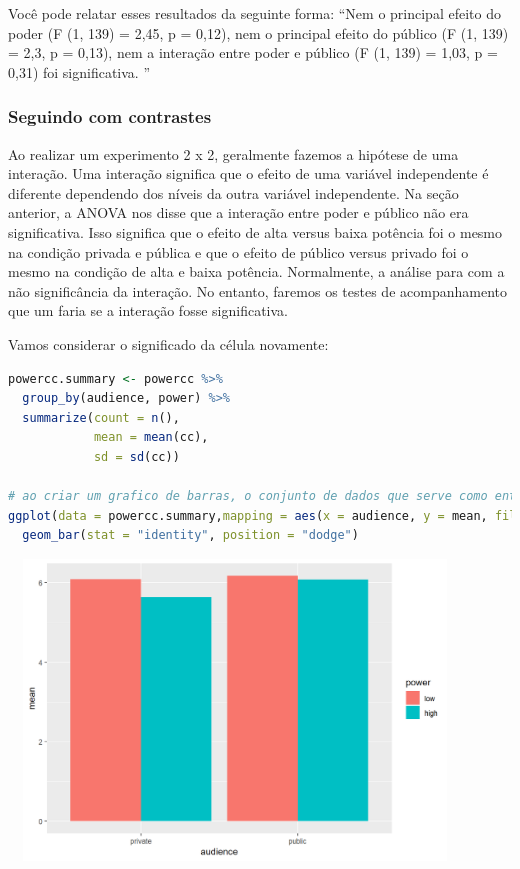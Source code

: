 \documentclass{article}
\begin{document}
Você pode relatar esses resultados da seguinte forma: “Nem o principal efeito do poder (F (1, 139) = 2,45, p = 0,12), nem o principal efeito do público (F (1, 139) = 2,3, p = 0,13), nem a interação entre poder e público (F (1, 139) = 1,03, p = 0,31) foi significativa. ”

\subsubsection{Seguindo com contrastes}

Ao realizar um experimento 2 x 2, geralmente fazemos a hipótese de uma interação. Uma interação significa que o efeito de uma variável independente é diferente dependendo dos níveis da outra variável independente. Na seção anterior, a ANOVA nos disse que a interação entre poder e público não era significativa. Isso significa que o efeito de alta versus baixa potência foi o mesmo na condição privada e pública e que o efeito de público versus privado foi o mesmo na condição de alta e baixa potência. Normalmente, a análise para com a não significância da interação. No entanto, faremos os testes de acompanhamento que um faria se a interação fosse significativa.

Vamos considerar o significado da célula novamente:

\begin{lstlisting}[language=R]
powercc.summary <- powercc %>% 
  group_by(audience, power) %>% 
  summarize(count = n(),
            mean = mean(cc),
            sd = sd(cc))

# ao criar um grafico de barras, o conjunto de dados que serve como entrada para o ggplot eh o resumo com os meios, nao o conjunto de dados completo
ggplot(data = powercc.summary,mapping = aes(x = audience, y = mean, fill = power)) + 
  geom_bar(stat = "identity", position = "dodge")
\end{lstlisting}

\begin{center}
\includegraphics[width=12cm,height=8cm]{bda_contrasts0-1.png}
\end{center}
\end{document}
